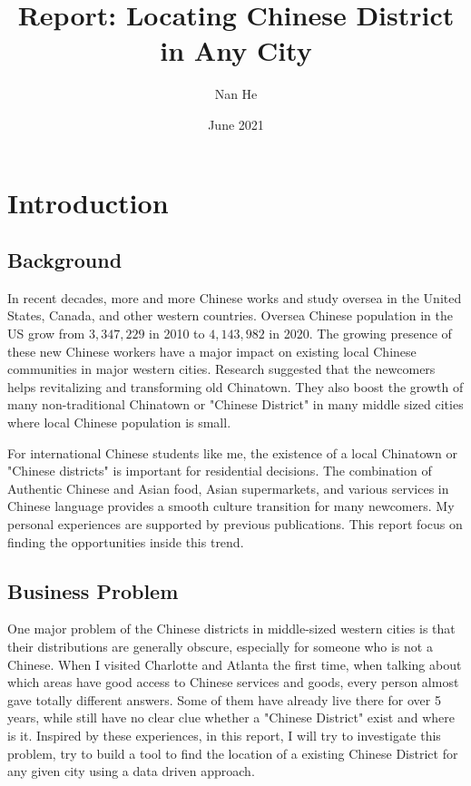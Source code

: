 \documentclass{article}
\title{Report: Locating Chinese District in Any City}
\author{Nan He}
\date{June 2021}
\begin{document}
\maketitle

\section{Introduction}
\subsection{Background}
In recent decades, more and more Chinese works and study oversea in the United States, Canada, and other western countries.
Oversea Chinese population in the US grow from $3,347,229$ in 2010 to $4,143,982$ in 2020.\cite{census2010chi, census2020chi}
The growing presence of these new Chinese workers have a major impact on existing local Chinese communities in major western cities.
Research suggested that the newcomers helps revitalizing and transforming old Chinatown. \cite{jia2010chinatown}
They also boost the growth of many non-traditional Chinatown or "Chinese District" in many middle sized cities where local Chinese population is small.

For international Chinese students like me, the existence of a local Chinatown or "Chinese districts" is important for residential decisions.
The combination of Authentic Chinese and Asian food, Asian supermarkets, and various services in Chinese language provides a smooth culture transition for many newcomers. My personal experiences are supported by previous publications.\cite{zhou2010chinatown} This report focus on finding the opportunities inside this trend.

\subsection{Business Problem}
One major problem of the Chinese districts in middle-sized western cities is that their distributions are generally obscure, especially for someone who is not a Chinese.
When I visited Charlotte and Atlanta the first time, when talking about which areas have good access to Chinese services and goods, every person almost gave totally different answers.
Some of them have already live there for over 5 years, while still have no clear clue whether a "Chinese District" exist and where is it.
Inspired by these experiences, in this report, I will try to investigate this problem, try to build a tool to find the location of a existing Chinese District for any given city using a data driven approach.
\end{document}
